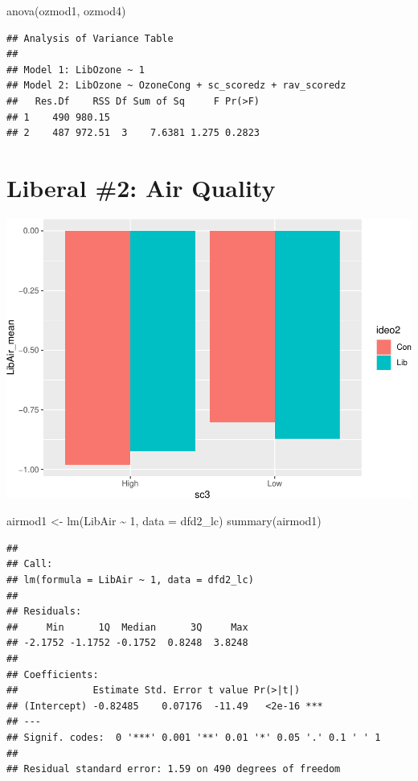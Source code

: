 \documentclass[
]{article}
\newenvironment{Shaded}{\begin{snugshade}}{\end{snugshade}}
\newcommand{\AttributeTok}[1]{\textcolor[rgb]{0.77,0.63,0.00}{#1}}
\newcommand{\DecValTok}[1]{\textcolor[rgb]{0.00,0.00,0.81}{#1}}
\newcommand{\FunctionTok}[1]{\textcolor[rgb]{0.00,0.00,0.00}{#1}}
\newcommand{\NormalTok}[1]{#1}
\newcommand{\OtherTok}[1]{\textcolor[rgb]{0.56,0.35,0.01}{#1}}
\newcommand{\SpecialCharTok}[1]{\textcolor[rgb]{0.00,0.00,0.00}{#1}}
\begin{document}
\begin{Shaded}
\begin{Highlighting}[]
\FunctionTok{anova}\NormalTok{(ozmod1, ozmod4)}
\end{Highlighting}
\end{Shaded}

\begin{verbatim}
## Analysis of Variance Table
## 
## Model 1: LibOzone ~ 1
## Model 2: LibOzone ~ OzoneCong + sc_scoredz + rav_scoredz
##   Res.Df    RSS Df Sum of Sq     F Pr(>F)
## 1    490 980.15                          
## 2    487 972.51  3    7.6381 1.275 0.2823
\end{verbatim}

\hypertarget{liberal-2-air-quality}{%
\section{Liberal \#2: Air Quality}\label{liberal-2-air-quality}}

\includegraphics{desc0829_files/figure-latex/unnamed-chunk-7-1.pdf}

\begin{Shaded}
\begin{Highlighting}[]
\NormalTok{airmod1 }\OtherTok{\textless{}{-}} \FunctionTok{lm}\NormalTok{(LibAir }\SpecialCharTok{\textasciitilde{}} \DecValTok{1}\NormalTok{, }\AttributeTok{data =}\NormalTok{ dfd2\_lc)}
\FunctionTok{summary}\NormalTok{(airmod1)}
\end{Highlighting}
\end{Shaded}

\begin{verbatim}
## 
## Call:
## lm(formula = LibAir ~ 1, data = dfd2_lc)
## 
## Residuals:
##     Min      1Q  Median      3Q     Max 
## -2.1752 -1.1752 -0.1752  0.8248  3.8248 
## 
## Coefficients:
##             Estimate Std. Error t value Pr(>|t|)    
## (Intercept) -0.82485    0.07176  -11.49   <2e-16 ***
## ---
## Signif. codes:  0 '***' 0.001 '**' 0.01 '*' 0.05 '.' 0.1 ' ' 1
## 
## Residual standard error: 1.59 on 490 degrees of freedom
\end{verbatim}
\end{document}
